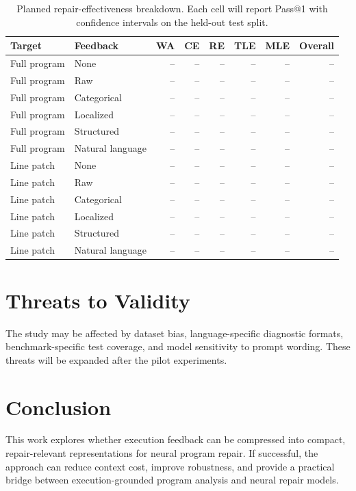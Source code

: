 \documentclass[conference]{IEEEtran}
\begin{document}
\begin{table}[t]
\centering
\caption{Planned repair-effectiveness breakdown. Each cell will report Pass@1 with confidence intervals on the held-out test split.}
\label{tab:planned-repair-breakdown}
\begin{tabular}{llrrrrrr}
\toprule
Target & Feedback & WA & CE & RE & TLE & MLE & Overall \\
\midrule
Full program & None & -- & -- & -- & -- & -- & -- \\
Full program & Raw & -- & -- & -- & -- & -- & -- \\
Full program & Categorical & -- & -- & -- & -- & -- & -- \\
Full program & Localized & -- & -- & -- & -- & -- & -- \\
Full program & Structured & -- & -- & -- & -- & -- & -- \\
Full program & Natural language & -- & -- & -- & -- & -- & -- \\
Line patch & None & -- & -- & -- & -- & -- & -- \\
Line patch & Raw & -- & -- & -- & -- & -- & -- \\
Line patch & Categorical & -- & -- & -- & -- & -- & -- \\
Line patch & Localized & -- & -- & -- & -- & -- & -- \\
Line patch & Structured & -- & -- & -- & -- & -- & -- \\
Line patch & Natural language & -- & -- & -- & -- & -- & -- \\
\bottomrule
\end{tabular}
\end{table}

\section{Threats to Validity}

The study may be affected by dataset bias, language-specific diagnostic formats, benchmark-specific test coverage, and model sensitivity to prompt wording. These threats will be expanded after the pilot experiments.

\section{Conclusion}

This work explores whether execution feedback can be compressed into compact, repair-relevant representations for neural program repair. If successful, the approach can reduce context cost, improve robustness, and provide a practical bridge between execution-grounded program analysis and neural repair models.

\nocite{placeholder}


\end{document}
